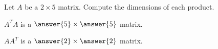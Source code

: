 \documentclass{ximera}
\author{}
\begin{document}
\begin{exercise}
Let $A$ be a $2\times 5$ matrix.  Compute the dimensions of each product.

$A^TA$ is a $\answer{5}\times \answer{5}$ matrix.

$AA^T$ is a $\answer{2}\times \answer{2}$ matrix.

 \end{exercise}
 
\end{document}
